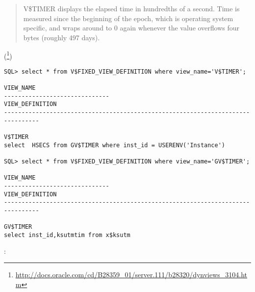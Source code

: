 \section{ \oracle}

 

\begin{framed}
\begin{quotation}
V\$TIMER displays the elapsed time in hundredths of a second. Time is measured since the beginning of the epoch, which is operating system specific, and wraps around to 0 again whenever the value overflows four bytes (roughly 497 days).
\end{quotation}
\end{framed}(\footnote{\url{http://docs.oracle.com/cd/B28359_01/server.111/b28320/dynviews_3104.htm}})



\begin{lstlisting}
SQL> select * from V$FIXED_VIEW_DEFINITION where view_name='V$TIMER';

VIEW_NAME
------------------------------
VIEW_DEFINITION
--------------------------------------------------------------------------------

V$TIMER
select  HSECS from GV$TIMER where inst_id = USERENV('Instance')

SQL> select * from V$FIXED_VIEW_DEFINITION where view_name='GV$TIMER';

VIEW_NAME
------------------------------
VIEW_DEFINITION
--------------------------------------------------------------------------------

GV$TIMER
select inst_id,ksutmtim from x$ksutm
\end{lstlisting}

:

